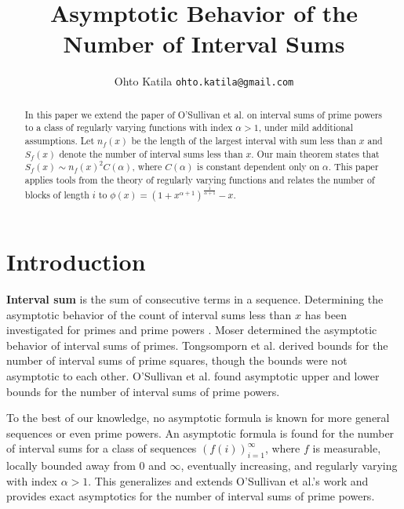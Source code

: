 \documentclass[10pt]{article}
\title{Asymptotic Behavior of the Number of Interval Sums}
\author{Ohto Katila \small \texttt{ohto.katila@gmail.com}}
\theoremstyle{plain}
\theoremstyle{definition}
\begin{document}
	\maketitle
	
	\begin{abstract}
		In this paper we extend the paper of O'Sullivan et al. on interval sums of prime powers to a class of regularly varying functions with index $\alpha>1$, under mild additional assumptions. Let $n_f(x)$ be the length of the largest interval with sum less than $x$ and $S_f(x)$ denote the number of interval sums less than $x$. Our main theorem states that $S_f(x)\sim n_f(x)^2C(\alpha)$, where $C(\alpha)$ is constant dependent only on $\alpha$. This paper applies tools from the theory of regularly varying functions and relates the number of blocks of length $i$ to $\phi(x)=(1+x^{\alpha+1})^{\frac{1}{\alpha+1}}-x$.
	\end{abstract}	
	
	
	
	
	
	
	
	
	
	
	
	
	
	
	
	\section{Introduction}
	\textbf{Interval sum} is the sum of consecutive terms in a sequence. Determining the asymptotic behavior of the count of interval sums less than $x$ has been investigated for primes and prime powers \cite{Moser_1963, primePowerConsecutiveSums, primeSquaresConsecutiveSums}. Moser \cite{Moser_1963} determined the asymptotic behavior of interval sums of primes. Tongsomporn et al. \cite{primeSquaresConsecutiveSums} derived  bounds for the number of interval sums of prime squares, though the bounds were not asymptotic to each other. O'Sullivan et al. \cite{primePowerConsecutiveSums} found asymptotic upper and lower bounds for the number of interval sums of prime powers.
	
	To the best of our knowledge, no asymptotic formula is known for more general sequences or even prime powers. An asymptotic formula is found for the number of interval sums for a class of sequences $\left(f(i)\right)_{i=1}^{\infty}$, where $f$ is measurable, locally bounded away from 0 and $\infty$, eventually increasing, and regularly varying with index $\alpha> 1$. This generalizes and extends O'Sullivan et al.'s work and provides exact asymptotics for the number of interval sums of prime powers. 
	
\end{document}
